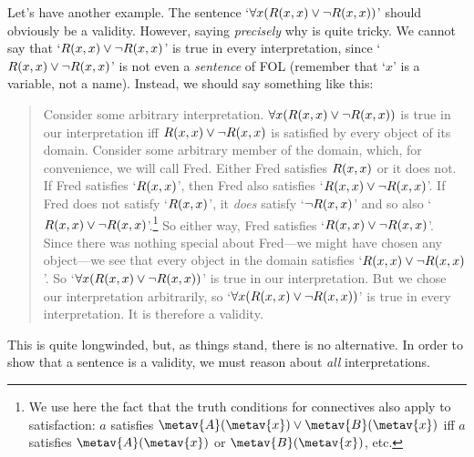Let's have another example. The sentence `$\forall x(\mathord{R}(x,x)\vee\neg \mathord{R}(x,x))$' should obviously be a validity. However, saying \emph{precisely} why is quite tricky. We cannot say that `$\mathord{R}(x,x) \vee\neg \mathord{R}(x,x)$' is true in every interpretation, since `$\mathord{R}(x,x) \vee\neg \mathord{R}(x,x)$' is not even a \emph{sentence} of FOL (remember that `$x$' is a variable, not a name). Instead, we should say something like this:
	\begin{quote}
		Consider some arbitrary interpretation. $\forall x(\mathord{R}(x,x)\vee \neg\mathord{R}(x,x))$ is true in our interpretation iff $\mathord{R}(x,x)\vee\neg\mathord{R}(x,x)$ is satisfied by every object of its domain. Consider some arbitrary member of the domain, which, for convenience, we will call Fred. Either Fred satisfies $\mathord{R}(x,x)$ or it does not. If Fred satisfies `$\mathord{R}(x,x)$', then Fred also satisfies `$\mathord{R}(x,x) \vee \neg \mathord{R}(x,x)$'. If Fred does not satisfy `$\mathord{R}(x,x)$', it \emph{does} satisfy `$\neg\mathord{R}(x,x)$' and so also `$\mathord{R}(x,x) \vee\neg \mathord{R}(x,x)$'.\footnote{We use here the fact that the truth conditions for connectives also apply to satisfaction: $a$ satisfies $\metav{A}(\metav{x}) \lor \metav{B}(\metav{x})$ iff $a$ satisfies $\metav{A}(\metav{x})$ or $\metav{B}(\metav{x})$, etc.} So either way, Fred satisfies `$\mathord{R}(x,x) \vee\neg \mathord{R}(x,x)$'. Since there was nothing special about Fred---we might have chosen any object---we see that every object in the domain satisfies `$\mathord{R}(x,x) \vee\neg \mathord{R}(x,x)$'. So `$\forall x (\mathord{R}(x,x) \vee\neg \mathord{R}(x,x))$' is true in our interpretation. But we chose our interpretation arbitrarily, so `$\forall x (\mathord{R}(x,x) \vee\neg \mathord{R}(x,x))$' is true in every interpretation. It is therefore a validity.
	\end{quote}
This is quite longwinded, but, as things stand, there is no alternative. In order to show that a sentence is a validity, we must reason about \emph{all} interpretations. 


